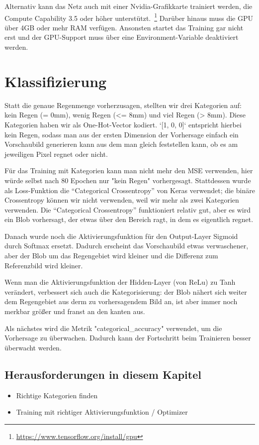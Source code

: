 \documentclass[11pt]{article}
\begin{document}
Alternativ kann das Netz auch mit einer Nvidia-Grafikkarte trainiert werden, die Compute Capability 3.5 oder höher unterstützt.~\footnote{\url{https://www.tensorflow.org/install/gpu}} Darüber hinaus muss die GPU über 4GB oder mehr RAM verfügen. Ansonsten startet das Training gar nicht erst und der GPU-Support muss über eine Environment-Variable deaktiviert werden.


\section{Klassifizierung}
Statt die genaue Regenmenge vorherzusagen, stellten wir drei Kategorien auf: kein Regen (= 0mm), wenig Regen (<= 8mm) und viel Regen (> 8mm). Diese Kategorien haben wir als One-Hot-Vector kodiert. `[1, 0, 0]` entspricht hierbei kein Regen, sodass man aus der ersten Dimension der Vorhersage einfach ein Vorschaubild generieren kann aus dem man gleich feststellen kann, ob es am jeweiligen Pixel regnet oder nicht.

Für das Training mit Kategorien kann man nicht mehr den MSE verwenden, hier würde selbst nach 80 Epochen nur "kein Regen" vorhergesagt. Stattdessen wurde als Loss-Funktion die \enquote{Categorical Crossentropy} von Keras verwendet; die binäre Crossentropy können wir nicht verwenden, weil wir mehr als zwei Kategorien verwenden. Die \enquote{Categorical Crossentropy} funktioniert relativ gut, aber es wird ein Blob vorhersagt, der etwas über den Bereich ragt, in dem es eigentlich regnet.

Danach wurde noch die Aktivierungsfunktion für den Output-Layer Sigmoid durch Softmax ersetzt. Dadurch erscheint das Vorschaubild etwas verwaschener, aber der Blob um das Regengebiet wird kleiner und die Differenz zum Referenzbild wird kleiner.

Wenn man die Aktivierungsfunktion der Hidden-Layer (von ReLu) zu Tanh verändert, verbessert sich auch die Kategorisierung: der Blob nähert sich weiter dem Regengebiet aus derm zu vorhersagendem Bild an, ist aber immer noch merkbar größer und franst an den kanten aus.

Als nächstes wird die Metrik "categorical\_accuracy" verwendet, um die Vorhersage zu überwachen. Dadurch kann der Fortschritt beim Trainieren besser überwacht werden.


\subsection{Herausforderungen in diesem Kapitel}
\begin{itemize}
\item Richtige Kategorien finden
\item Training mit richtiger Aktivierungsfunktion / Optimizer
\end{itemize}
\end{document}
